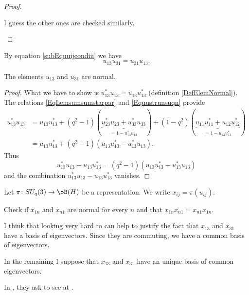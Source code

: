 \begin{proof}
    \begin{probleme}
        I guess the other ones are checked similarly.
    \end{probleme}
\end{proof}

By equation \eqref{subEquuijcondiii} we have
\begin{equation}
    u_{13}u_{31}=u_{31}u_{13}.
\end{equation}

\begin{lemma}
    The elements \( u_{13}\) and \( u_{31}\) are normal.
\end{lemma}

\begin{proof}
    What we have to show is \( u_{13}^*u_{13}=u_{13}u_{13}^*\) (definition \ref{DefElemNormal}). The relations \eqref{EqLemsumsumstarpar} and \eqref{Equustrunsuqn} provide
    \begin{subequations}
        \begin{align}
            u_{13}^*u_{13}&=u_{13}u_{13}^*+(q^2-1)(\underbrace{u_{23}^*u_{23}+u_{33}^*u_{33}}_{=1-u_{13}^*u_{13}})+(1-q^2)(\underbrace{u_{11}u_{11}^*+u_{12}u_{12}^*}_{=1-u_{13}u_{13}^*})\\
            &=u_{13}u_{13}^*+(q^2-1)(u_{13}u_{13}^*-u_{13}^*u_{13}).
        \end{align}
    \end{subequations}
    Thus
    \begin{equation}
        u_{13}^*u_{13}-u_{13}u_{13}^*=(q^2-1)(u_{13}u_{13}^*-u_{13}^*u_{13})
    \end{equation}
    and the combination \( u_{13}^*u_{13}-u_{13}u_{13}^*\) vanishes.
\end{proof}

Let \( \pi\colon SU_q(3)\to \oB(H)\) be a representation. We write \( x_{ij}=\pi(u_{ij})\).

\begin{probleme}
    Check if \( x_{1n}\) and \( x_{n1}\) are normal for every \( n\) and that \( x_{1n}x_{n1}=x_{n1}x_{1n}\).
\end{probleme}

\begin{probleme}
    I think that looking very hard to \cite{AndrewGreen} can help to justify the fact that \( x_{13}\) and \( x_{31}\) have a basis of eigenvectors. Since they are commuting, we have a common basis of eigenvectors.

    In the remaining I suppose that \( x_{13}\) and \( x_{31}\) have an unique basis of common eigenvectors.

    In \cite{Bragiel}, they ask to see at \cite{PuszWoronowicz}.
\end{probleme}

